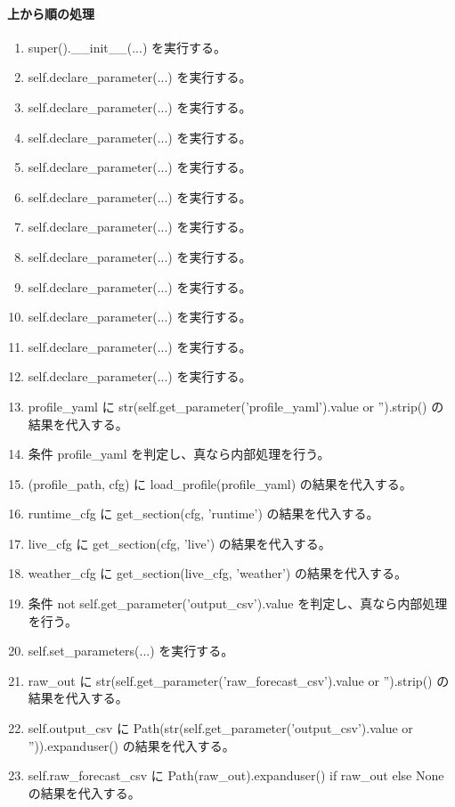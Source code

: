 \documentclass[a4paper,11pt]{article}
\begin{document}
            \paragraph{上から順の処理}
            \begin{enumerate}[leftmargin=1.8em]
            \item super().\_\_init\_\_(...) を実行する。
\item self.declare\_parameter(...) を実行する。
\item self.declare\_parameter(...) を実行する。
\item self.declare\_parameter(...) を実行する。
\item self.declare\_parameter(...) を実行する。
\item self.declare\_parameter(...) を実行する。
\item self.declare\_parameter(...) を実行する。
\item self.declare\_parameter(...) を実行する。
\item self.declare\_parameter(...) を実行する。
\item self.declare\_parameter(...) を実行する。
\item self.declare\_parameter(...) を実行する。
\item self.declare\_parameter(...) を実行する。
\item profile\_yaml に str(self.get\_parameter('profile\_yaml').value or '').strip() の結果を代入する。
\item 条件 profile\_yaml を判定し、真なら内部処理を行う。
\item   (profile\_path, cfg) に load\_profile(profile\_yaml) の結果を代入する。
\item   runtime\_cfg に get\_section(cfg, 'runtime') の結果を代入する。
\item   live\_cfg に get\_section(cfg, 'live') の結果を代入する。
\item   weather\_cfg に get\_section(live\_cfg, 'weather') の結果を代入する。
\item   条件 not self.get\_parameter('output\_csv').value を判定し、真なら内部処理を行う。
\item     self.set\_parameters(...) を実行する。
\item raw\_out に str(self.get\_parameter('raw\_forecast\_csv').value or '').strip() の結果を代入する。
\item self.output\_csv に Path(str(self.get\_parameter('output\_csv').value or '')).expanduser() の結果を代入する。
\item self.raw\_forecast\_csv に Path(raw\_out).expanduser() if raw\_out else None の結果を代入する。

\end{enumerate}
\end{document}
